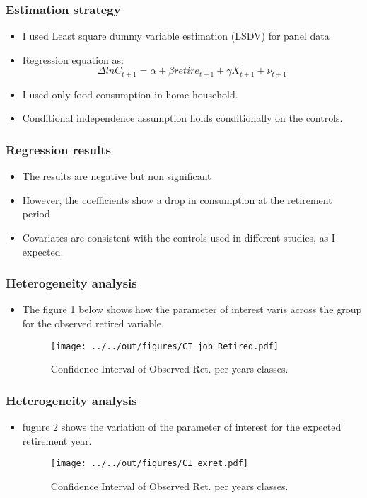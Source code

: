 \documentclass[11pt]{beamer}
\begin{document}
\begin{frame}[t]
    \frametitle{Estimation strategy}
    \begin{itemize}
        \item I used Least square dummy variable estimation (LSDV) for panel data
        \item Regression equation as:
            \begin{equation}
                \label{1stequation}
                \Delta ln C_{t+1} = \alpha + \beta retire_{t+1} + \gamma X_{t+1} + \nu_{t+1}
            \end{equation}
        \item I used only food consumption in home household.
        \item Conditional independence assumption holds conditionally on the controls.
   \end{itemize}
    \note{~}
\end{frame}

\begin{frame}[t]
    \frametitle{Regression results}
    \begin{itemize}
        \item The results are negative but non significant
        \item However, the coefficients show a drop in consumption at the retirement period
        \item Covariates are consistent with the controls used in different studies, as I expected.
   \end{itemize}
    \note{~}
\end{frame}

\begin{frame}[t]
    \frametitle{Heterogeneity analysis}
    \begin{itemize}
        \item The figure 1  below shows how the parameter of interest varis across the group for the observed retired variable.
            \begin{figure}[h]
                \centering
                \texttt{[image: ../../out/figures/CI\_job\_Retired.pdf]}
                \caption{Confidence Interval of Observed Ret. per years classes.}
            \end{figure}
   \end{itemize}
    \note{~}
\end{frame}

\begin{frame}[t]
    \frametitle{Heterogeneity analysis}
    \begin{itemize}
        \item fugure 2 shows the variation of the parameter of interest for the expected retirement year.
            \begin{figure}[h]
                \centering
                \texttt{[image: ../../out/figures/CI\_exret.pdf]}
                \caption{Confidence Interval of Observed Ret. per years classes.}
            \end{figure}
   \end{itemize}
    \note{~}
\end{frame}
\end{document}

